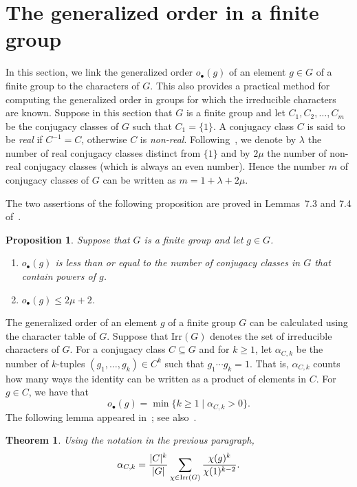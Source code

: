 \documentclass[12pt,leqno]{amsart}
\newtheorem{thm}[theorem]{\sc Theorem}
\newtheorem{prop}[theorem]{\sc Proposition}
\theoremstyle{definition}
\newcommand{\go}[1]{o_{\bullet}(#1)}
\begin{document}
\section{The generalized order in a finite group}\label{sec:fin}

In this section, we link the generalized order $\go g$ of an element $g\in G$ of a finite group  to the characters of $G$. This also provides a practical method for computing 
the generalized order in groups for which the irreducible characters are known.
Suppose in this section that $G$ is a finite group and let $C_1,C_2,\ldots,C_m$ be the conjugacy classes
of $G$ such that $C_1=\{1\}$. A conjugacy class $C$ is said to be {\em real} if $C^{-1}=C$, otherwise $C$ is {\em non-real}. Following~\cite{ASH}, we denote by $\lambda$
the number of real conjugacy classes distinct from $\{1\}$ and by $2\mu$ the  number of non-real conjugacy classes (which is always an even number). 
Hence the number $m$ of conjugacy classes 
of $G$ can be written as $m=1+\lambda+2\mu$.

The two assertions of the following proposition are proved in Lemmas~7.3 and 7.4 of~\cite{ASH}.

\begin{prop} \label{Thm:bounding}
Suppose that $G$ is a finite group and let $g\in G$.
\begin{enumerate}
\item $\go g$ is less than or equal to the number of conjugacy classes in $G$ that contain powers of $g$.
\item $\go g\leq 2\mu+2$.
\end{enumerate}
\end{prop}


The generalized order of an element $g$ of a finite group $G$ can be calculated using the character table of $G$. Suppose that 
$\mbox{Irr}(G)$ denotes the set of irreducible characters of $G$. 
For a conjugacy class $C\subseteq G$ and for $k\geq 1$, let $\alpha_{C,k}$ be the number of $k$-tuples $(g_1,\ldots,g_k)\in C^k$ such that
$g_1\cdots g_k=1$. That is, $\alpha_{C,k}$ counts how many ways the identity can be written as a product of elements in $C$. 
For $g\in C$, we have that  
\[
\go g=\min\{k\geq 1\mid \alpha_{C,k}>0\}.
\]
The following lemma appeared in~\cite[Lemma~10.10]{ASH}; see also~\cite[Equation~(1)]{Sha}.

\begin{thm}\label{th:char}
Using the notation in the previous paragraph, 
\begin{equation}\label{eq:alpha}
\alpha_{C,k}=\frac{|C|^k}{|G|}\sum_{\chi\in{\rm Irr}(G)}\frac{\chi(g)^k}{\chi(1)^{k-2}}.
\end{equation}
\end{thm}
\end{document}
